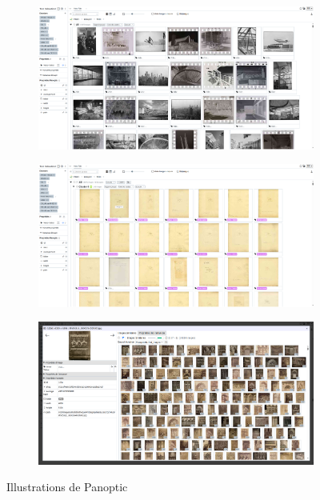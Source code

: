 \begin{figure}[H]
    \centering
    \begin{subfigure}{0.8\textwidth}
        \includegraphics[width=\linewidth]{Illustrations/Panoptic1.png}
        \caption{}
    \end{subfigure}
    \begin{subfigure}{0.8\textwidth}
        \includegraphics[width=\linewidth]{Illustrations/Panoptic2.png}
        \caption{}
    \end{subfigure}
    \begin{subfigure}{0.8\textwidth}
        \includegraphics[width=\linewidth]{Illustrations/Panoptic3.png}
        \caption{}
    \end{subfigure}
    \caption{Illustrations de Panoptic}
    \label{fig:pellicules}
\end{figure}

